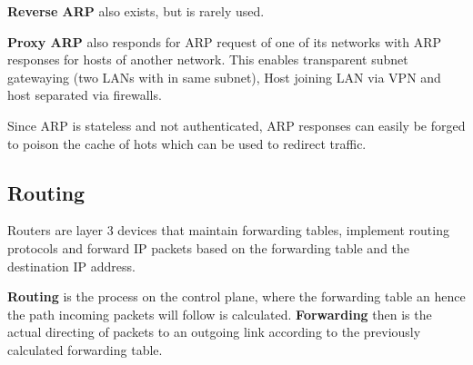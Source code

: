 \textbf{Reverse ARP} also exists, but is rarely used.

\textbf{Proxy ARP} also responds for ARP request of one of its networks with ARP responses for hosts of another network.
This enables transparent subnet gatewaying (two LANs with in same subnet), Host joining LAN via VPN and host separated via firewalls.
\vspace{5pt}

Since ARP is stateless and not authenticated, ARP responses can easily be forged to poison the cache of hots which can be used to redirect traffic.

\subsection{Routing}
Routers are layer 3 devices that maintain forwarding tables, implement routing protocols and forward IP packets based on the forwarding table and the destination IP address.

\textbf{Routing} is the process on the control plane, where the forwarding table an hence the path incoming packets will follow is calculated.
\textbf{Forwarding} then is the actual directing of packets to an outgoing link according to the previously calculated forwarding table.
